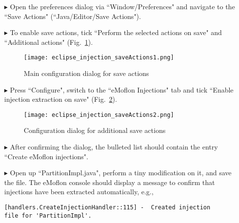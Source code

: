 \begin{itemize}

\item[$\blacktriangleright$] 
Open the preferences dialog via ``Window/Preferences" and navigate to the ``Save Actions" (``Java/Editor/Save Actions").

\item[$\blacktriangleright$]
To enable save actions, tick ``Perform the selected actions on save" and ``Additional actions" (Fig.~\ref{eclipse:injection_saveActions1}).

\begin{figure}[htbp]
    \centering
    \texttt{[image: eclipse\_injection\_saveActions1.png]}
    \caption{Main configuration dialog for save actions}
    \label{eclipse:injection_saveActions1}
\end{figure}

\item[$\blacktriangleright$]
Press ``Configure", switch to the ``eMoflon Injections" tab and tick ``Enable injection extraction on save" (Fig.~\ref{eclipse:injection_saveActions2}).

\begin{figure}[htbp]
    \centering
    \texttt{[image: eclipse\_injection\_saveActions2.png]}
    \caption{Configuration dialog for additional save actions}
    \label{eclipse:injection_saveActions2}
\end{figure}

\item[$\blacktriangleright$]
After confirming the dialog, the bulleted list should contain the entry ``Create eMoflon injections".

\item[$\blacktriangleright$]
Open up ``PartitionImpl.java", perform a tiny modification on it, and save the file.
The eMoflon console should display a message to confirm that injections have been extracted automatically, e.g.,
\begin{verbatim}
[handlers.CreateInjectionHandler::115] -  Created injection
file for 'PartitionImpl'.
\end{verbatim}

\end{itemize}

